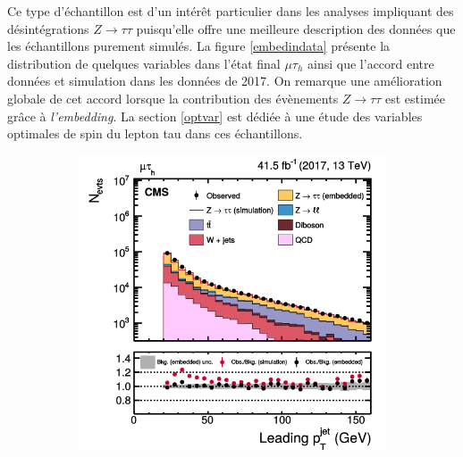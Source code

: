 Ce type d'échantillon est d'un intérêt particulier dans les analyses impliquant des désintégrations $Z\rightarrow\tau\tau$ puisqu'elle offre une meilleure description des données que les échantillons purement simulés. La figure \ref{embedindata} présente la distribution de quelques variables dans l'état final $\mu\tau_h$ ainsi que l'accord entre données et simulation dans les données de 2017. On remarque une amélioration globale de cet accord lorsque la contribution des évènements $Z\rightarrow\tau\tau$ est estimée grâce à \textit{l'embedding}. La section \ref{optvar} est dédiée à une étude des variables optimales de spin du lepton tau dans ces échantillons.  \\
\vskip 1cm
\begin{figure}[!ht]
  \begin{subfigure}[b]{0.33\linewidth}
    \centering
    \includegraphics[width=\linewidth]{Chapitre4/Images/leadj_embed.png} 
    \caption*{} 
    \vspace{0.5ex}
  \end{subfigure}%
  \begin{subfigure}[b]{0.33\linewidth}
    \centering

\end{subfigure}
\end{figure}
